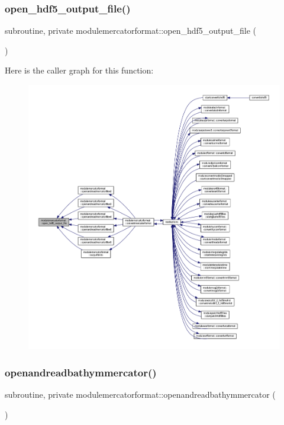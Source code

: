 \subsubsection{\texorpdfstring{open\+\_\+hdf5\+\_\+output\+\_\+file()}{open\_hdf5\_output\_file()}}
{\footnotesize\ttfamily subroutine, private modulemercatorformat\+::open\+\_\+hdf5\+\_\+output\+\_\+file (\begin{DoxyParamCaption}{ }\end{DoxyParamCaption})\hspace{0.3cm}{\ttfamily [private]}}

Here is the caller graph for this function\+:\nopagebreak
\begin{figure}[H]
\begin{center}
\leavevmode
\includegraphics[width=350pt]{namespacemodulemercatorformat_a856b781d5405606ffbd1e7409a516633_icgraph}
\end{center}
\end{figure}
\mbox{\label{namespacemodulemercatorformat_a35d03eb5f2e2fadb8622f62f744f0b97}} 
\subsubsection{\texorpdfstring{openandreadbathymmercator()}{openandreadbathymmercator()}}
{\footnotesize\ttfamily subroutine, private modulemercatorformat\+::openandreadbathymmercator (\begin{DoxyParamCaption}{ }\end{DoxyParamCaption})\hspace{0.3cm}{\ttfamily [private]}}

